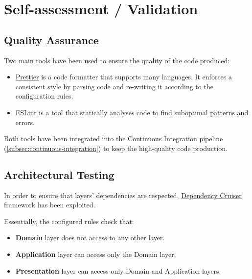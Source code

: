 \documentclass{scrartcl}
\begin{document}
    

    \section{Self-assessment / Validation}

    \subsection{Quality Assurance}\label{subsec:quality-assurance}

    Two main tools have been used to ensure the quality of the code produced:

    \begin{itemize}
        \item \href{https://prettier.io/}{Prettier} is a code formatter that supports many languages.
        It enforces a consistent style by parsing code and re-writing it according to the configuration rules.
        \item \href{https://eslint.org/}{ESLint} is a tool that statically analyses code to find suboptimal patterns and errors.
    \end{itemize}

    Both tools have been integrated into the Continuous Integration pipeline (\cref{subsec:continuous-integration}) to keep the high-quality code production.

    \subsection{Architectural Testing}\label{subsec:architecture-testing}

    In order to ensure that layers' dependencies are respected, \href{https://github.com/sverweij/dependency-cruiser}{Dependency Cruiser} framework has been exploited.

    Essentially, the configured rules check that:

    \begin{itemize}
        \item \textbf{Domain} layer does not access to any other layer.
        \item \textbf{Application} layer can access only the Domain layer.
        \item \textbf{Presentation} layer can access only Domain and Application layers.
    \end{itemize}
\end{document}
